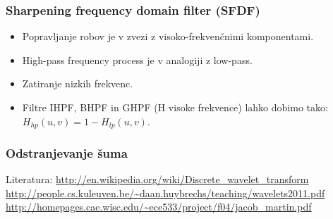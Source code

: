 \subsubsection{Sharpening frequency domain filter (SFDF)}
\begin{itemize}
\item Popravljanje robov je v zvezi z visoko-frekvenčnimi komponentami.
\item High-pass frequency process je v analogiji z low-pass.
\item Zatiranje nizkih frekvenc.
\item Filtre IHPF, BHPF in GHPF (H visoke frekvence) lahko dobimo tako: $ H_{hp}(u,v) = 1 - H_{lp}(u,v)$.
\end{itemize}
%
\subsubsection{Odstranjevanje šuma}
Literatura:
\url{ http://en.wikipedia.org/wiki/Discrete_wavelet_transform}\\
\url{http://people.cs.kuleuven.be/~daan.huybrechs/teaching/wavelets2011.pdf}\\
\url{http://homepages.cae.wisc.edu/~ece533/project/f04/jacob_martin.pdf}
